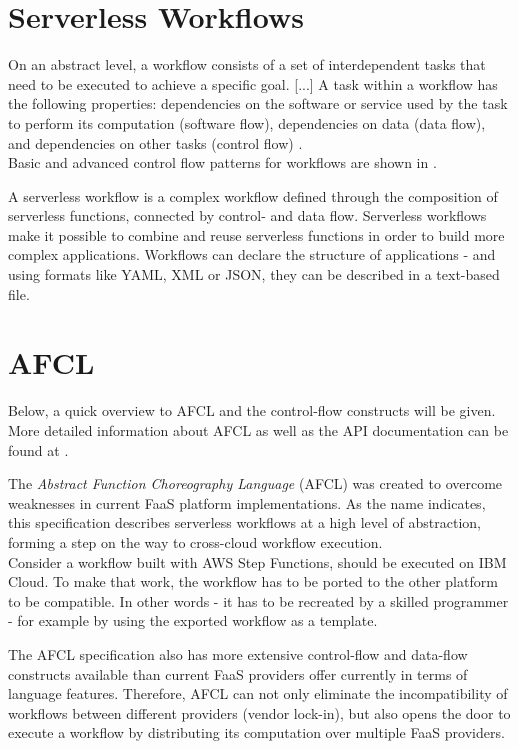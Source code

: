 \documentclass[a4paper,12pt,pdftex,halfparskip,cleardoubleempty,bibtotoc,liststotoc]{scrbook}
\begin{document}
\section{Serverless Workflows}
On an abstract level, a workflow consists of a set of interdependent tasks that need to be executed to achieve a specific goal. [...] A task within a workflow has the following properties: dependencies on the software or service used by the task to perform its computation (software flow), dependencies on data (data flow), and dependencies on other tasks (control flow) \cite{thesis-design-serverless-worfklow-system-eyk}.\\
Basic and advanced control flow patterns for workflows are shown in \cite{reports-workflow-control-patterns-russell}.

A serverless workflow is a complex workflow defined through the composition of serverless functions, connected by control- and data flow. Serverless workflows make it possible to combine and reuse serverless functions in order to build more complex applications. 
Workflows can declare the structure of applications - and using formats like YAML, XML or JSON, they can be described in a text-based file.

\section{AFCL}

Below, a quick overview to AFCL and the control-flow constructs will be given. More detailed information about AFCL as well as the API documentation can be found at \cite{online-afcl-dps}.

The \emph{Abstract Function Choreography Language} (AFCL) was created to overcome weaknesses in current FaaS platform implementations. As the name indicates, this specification describes serverless workflows at a high level of abstraction, forming a step on the way to cross-cloud workflow execution.\\
Consider a workflow built with AWS Step Functions, should be executed on IBM Cloud. To make that work, the workflow has to be ported to the other platform to be compatible. In other words - it has to be recreated by a skilled programmer - for example by using the exported workflow as a template.

The AFCL specification also has more extensive control-flow and data-flow constructs available than current FaaS providers offer currently in terms of language features. Therefore, AFCL can not only eliminate the incompatibility of workflows between different providers (vendor lock-in), but also opens the door to execute a workflow by distributing its computation over multiple FaaS providers.
\end{document}
